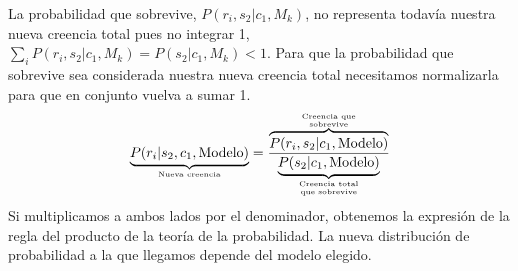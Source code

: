 \documentclass[a4paper,11pt]{book}
\newcommand\hfrac[2]{\genfrac{}{}{0pt}{}{#1}{#2}} %
\theoremstyle{definition}
\begin{document}
La probabilidad que sobrevive, $P(r_i, s_2|c_1,M_k)$, no representa todav\'ia nuestra nueva creencia total pues no integrar 1, $\sum_i P(r_i,s_2|c_1,M_k) = P(s_2|c_1,M_k) < 1$.
%
Para que la probabilidad que sobrevive sea considerada nuestra nueva creencia total necesitamos normalizarla para que en conjunto vuelva a sumar 1.
%
\begin{equation*}
\underbrace{P(r_i| s_2, c_1, \text{Modelo})}_{\hfrac{\text{Nueva creencia}}{\text{}}} = \frac{\overbrace{P(r_i, s_2|c_1, \text{Modelo})}^{\hfrac{\text{Creencia que}}{\text{sobrevive}}}}{\underbrace{P(s_2| c_1, \text{Modelo})}_{\hfrac{\text{Creencia total}}{\text{que sobrevive}}}}
\end{equation*}
%
Si multiplicamos a ambos lados por el denominador, obtenemos la expresi\'on de la regla del producto de la teor\'ia de la probabilidad.
%
La nueva distribuci\'on de probabilidad a la que llegamos depende del modelo elegido.
%
\end{document}
